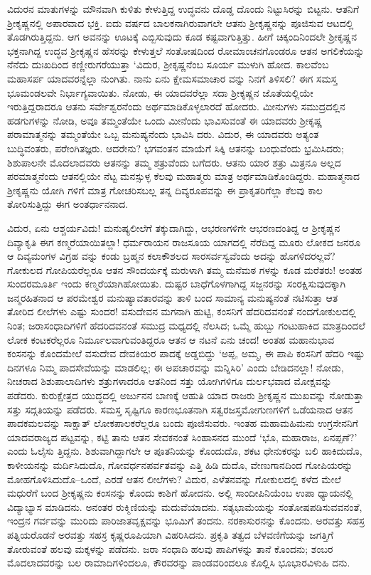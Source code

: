 ವಿದುರನ ಮಾತುಗಳನ್ನು ಮೌನವಾಗಿ ಕುಳಿತು ಕೇಳುತ್ತಿದ್ದ ಉದ್ಧವನು ದೊಡ್ಡ ದೊಂದು ನಿಟ್ಟುಸಿರನ್ನು ಬಿಟ್ಟನು. ಆತನಿಗೆ ಶ್ರೀಕೃಷ್ಣನಲ್ಲಿ ಅಪಾರವಾದ ಭಕ್ತಿ. ಐದು ವರ್ಷದ ಬಾಲಕನಾಗಿರುವಾಗಲೇ ಆತನು ಶ್ರೀಕೃಷ್ಣನನ್ನು ಪೂಜಿಸುವ ಆಟದಲ್ಲಿ ತೊಡಗಿರುತ್ತಿದ್ದನು. ಆಗ ಅವನನ್ನು ಊಟಕ್ಕೆ ಎಬ್ಬಿಸುವುದು ಕೂಡ ಕಷ್ಟವಾಗುತ್ತಿತ್ತು. ಹೀಗೆ ಚಿಕ್ಕಂದಿನಿಂದಲೇ ಶ್ರೀಕೃಷ್ಣನ ಭಕ್ತನಾಗಿದ್ದ ಉದ್ಧವ ಶ್ರೀಕೃಷ್ಣನ ಹೆಸರನ್ನು ಕೇಳುತ್ತಲೆ ಸಂತೋಷದಿಂದ ರೋಮಾಂಚನಗೊಂಡರೂ ಆತನ ಅಗಲಿಕೆಯನ್ನು ನೆನೆದು ದುಃಖದಿಂದ ಕಣ್ಣೀರುಗರೆಯುತ್ತಾ ‘ವಿದುರ, ಶ್ರೀಕೃಷ್ಣನೆಂಬ ಸೂರ್ಯ ಮುಳುಗಿ ಹೋದ. ಕಾಲವೆಂಬ ಮಹಾಸರ್ಪ ಯಾದವರನ್ನೆಲ್ಲಾ ನುಂಗಿತು. ನಾನು ಏನು ಕ್ಷೇಮಸಮಾಚಾರ ವನ್ನು ನಿನಗೆ ತಿಳಿಸಲಿ? ಈಗ ಸಮಸ್ತ ಭೂಮಂಡಲವೇ ನಿರ್ಭಾಗ್ಯವಾಯಿತು. ನೋಡು, ಈ ಯಾದವರೆಲ್ಲಾ ಸದಾ ಶ್ರೀಕೃಷ್ಣನ ಜೊತೆಯಲ್ಲಿಯೇ ಇರುತ್ತಿದ್ದರಾದರೂ ಆತನು ಸರ್ವೇಶ್ವರನೆಂದು ಅರ್ಥಮಾಡಿಕೊಳ್ಳಲಾರದೆ ಹೋದರು. ಮೀನುಗಳು ಸಮುದ್ರದಲ್ಲಿನ ಹಡಗುಗಳನ್ನು ನೋಡಿ, ಅವೂ ತಮ್ಮಂತೆಯೇ ಒಂದು ಮೀನೆಂದು ಭಾವಿಸುವಂತೆ ಈ ಯಾದವರು ಶ್ರೀಕೃಷ್ಣ ಪರಾಮಾತ್ಮನನ್ನು ತಮ್ಮಂತೆಯೇ ಒಬ್ಬ ಮನುಷ್ಯನೆಂದು ಭಾವಿಸಿ ದರು. ವಿದುರ, ಈ ಯಾದವರು ಅತ್ಯಂತ ಬುದ್ಧಿವಂತರು, ಪರೇಂಗಿತಜ್ಞರು. ಆದರೇನು? ಭಗವಂತನ ಮಾಯೆಗೆ ಸಿಕ್ಕಿ ಆತನನ್ನು ಬಂಧುವೆಂದು ಭ್ರಮಿಸಿದರು; ಶಿಶುಪಾಲನೇ ಮೊದಲಾದವರು ಆತನನ್ನು ತಮ್ಮ ಶತ್ರುವೆಂದು ಬಗೆದರು. ಆತನು ಯಾರ ಶತ್ರು ಮಿತ್ರನೂ ಅಲ್ಲದ ಪರಮಾತ್ಮನೆಂದು ಆತನಲ್ಲಿಯೇ ನೆಟ್ಟ ಮನಸ್ಸುಳ್ಳ ಕೆಲವು ಮಹಾತ್ಮರು ಮಾತ್ರ ಅರ್ಥಮಾಡಿಕೊಂಡಿದ್ದರು. ಮಹಾತ್ಮನಾದ ಶ್ರೀಕೃಷ್ಣನು ಯೋಗಿ ಗಳಿಗೆ ಮಾತ್ರ ಗೋಚರಿಸಬಲ್ಲ ತನ್ನ ದಿವ್ಯರೂಪವನ್ನು ಈ ಪ್ರಾಕೃತರಿಗೆಲ್ಲಾ ಕೆಲವು ಕಾಲ ತೋರಿಸುತ್ತಿದ್ದು ಈಗ ಅಂತರ್ಧಾನನಾದ.

ವಿದುರ, ಏನು ಆಶ್ಚರ್ಯವಿದು! ಮನುಷ್ಯಲೀಲೆಗೆ ತಕ್ಕುದಾಗಿದ್ದು, ಆಭರಣಗಳಿಗೇ ಆಭರಣದಂತಿದ್ದ ಆ ಶ್ರೀಕೃಷ್ಣನ ದಿವ್ಯಾಕೃತಿ ಈಗ ಕಣ್ಮರೆಯಾಯಿತಲ್ಲಾ! ಧರ್ಮರಾಯನ ರಾಜಸೂಯ ಯಾಗದಲ್ಲಿ ನೆರೆದಿದ್ದ ಮೂರು ಲೋಕದ ಜನರೂ ಆ ದಿವ್ಯಮಂಗಳ ವಿಗ್ರಹ ವನ್ನು ಕಂಡು ಬ್ರಹ್ಮನ ಕಲಾಕೌಶಲದ ಸಾರಸರ್ವಸ್ವವೆಂದು ಅದನ್ನು ಹೊಗಳಿದರಲ್ಲವೆ? ಗೋಕುಲದ ಗೋಪಿಯರೆಲ್ಲರೂ ಆತನ ಸೌಂದರ್ಯಕ್ಕೆ ಮರುಳಾಗಿ ತಮ್ಮ ಮನೆಮಠ ಗಳನ್ನು ಕೂಡ ಮರೆತರು! ಅಂತಹ ಸುಂದರಮೂರ್ತಿ ಇಂದು ಕಣ್ಮರೆಯಾಗಿಹೋಯಿತು. ದುಷ್ಟರ ಬಾಧೆಗೊಳಗಾಗಿದ್ದ ಸಜ್ಜನರನ್ನು ಸಂರಕ್ಷಿಸುವುದಕ್ಕಾಗಿ ಜನ್ಮರಹಿತನಾದ ಆ ಪರಮೇಶ್ವರ ಮನುಷ್ಯಾವತಾರವನ್ನು ತಾಳಿ ಬಂದ ಸಾಮಾನ್ಯ ಮನುಷ್ಯನಂತೆ ನಟಿಸುತ್ತಾ ಆತ ತೋರಿದ ಲೀಲೆಗಳು ಎಷ್ಟು ಸುಂದರ! ವಸುದೇವನ ಮಗನಾಗಿ ಹುಟ್ಟಿ, ಕಂಸನಿಗೆ ಹೆದರಿದವನಂತೆ ನಂದಗೋಕುಲದಲ್ಲಿ ನಿಂತ; ಜರಾಸಂಧಾದಿಗಳಿಗೆ ಹೆದರಿದವನಂತೆ ಸಮುದ್ರ ಮಧ್ಯದಲ್ಲಿ ನೆಲಸಿದ; ಒಮ್ಮೆ ಹುಬ್ಬು ಗಂಟುಹಾಕಿದ ಮಾತ್ರದಿಂದಲೆ ಲೋಕ ಕಂಟಕರೆಲ್ಲರೂ ನಿರ್ಮೂಲವಾಗುವಂತಿದ್ದರೂ ಆತನ ಆ ನಟನೆ ಏನು ಚಂದ! ಅಂತಹ ಮಹಾನುಭಾವ ಕಂಸನನ್ನು ಕೊಂದಮೇಲೆ ವಸುದೇವ ದೇವಕಿಯರ ಪಾದಕ್ಕೆ ಅಡ್ಡಬಿದ್ದು ‘ಅಪ್ಪ, ಅಮ್ಮ, ಈ ಪಾಪಿ ಕಂಸನಿಗೆ ಹೆದರಿ ಇಷ್ಟು ದಿನಗಳೂ ನಿಮ್ಮ ಪಾದಸೇವೆಯನ್ನು ಮಾಡಲಿಲ್ಲ; ಈ ಅಪಚಾರವನ್ನು ಮನ್ನಿಸಿರಿ’ ಎಂದು ಬೇಡಿದನಲ್ಲಾ! ನೋಡು, ನೀಚರಾದ ಶಿಶುಪಾಲಾದಿಗಳು ಶತ್ರುಗಳಾದರೂ ಆತನಿಂದ ಸತ್ತು ಯೋಗಿಗಳಿಗೂ ದುರ್ಲಭವಾದ ಮೋಕ್ಷವನ್ನು ಪಡೆದರು. ಕುರುಕ್ಷೇತ್ರದ ಯುದ್ಧದಲ್ಲಿ ಅರ್ಜುನನ ಬಾಣಕ್ಕೆ ಆಹುತಿ ಯಾದ ರಾಜರು ಶ್ರೀಕೃಷ್ಣನ ಮುಖವನ್ನು ನೋಡುತ್ತಾ ಸತ್ತು ಸದ್ಗತಿಯನ್ನು ಪಡೆದರು. ಸಮಸ್ತ ಸೃಷ್ಟಿಗೂ ಕಾರಣಭೂತನಾಗಿ ಸತ್ವರಜಸ್ತಮೋಗುಣಗಳಿಗೆ ಒಡೆಯನಾದ ಆತನ ಪಾದಕಮಲವನ್ನು ಸಾಕ್ಷಾತ್ ಲೋಕಪಾಲಕರೆಲ್ಲರೂ ಬಂದು ಪೂಜಿಸುವರು. ಇಂತಹ ಮಹಾಮಹಿಮನು ಉಗ್ರಸೇನನಿಗೆ ಯಾದವರಾಜ್ಯದ ಪಟ್ಟವನ್ನು, ಕಟ್ಟಿ ತಾನು ಆತನ ಸೇವಕನಂತೆ ಸಿಂಹಾಸನದ ಮುಂದೆ ‘ಭೊ, ಮಹಾರಾಜ, ಏನಪ್ಪಣೆ?’ ಎಂದು ಓಲೈಸು ತ್ತಿದ್ದನು. ಶಿಶುವಾಗಿದ್ದಾಗಲೇ ಆ ಪೂತನಿಯನ್ನು ಕೊಂದುದೊ, ಶಕಟ ಧೇನುಕರನ್ನು ಬಲಿ ಹಾಕಿದುದೊ, ಕಾಳೀಯನನ್ನು ಮರ್ದಿಸಿದುದೊ, ಗೋವರ್ಧನಪರ್ವತವನ್ನು ಎತ್ತಿ ಹಿಡಿ ದುದೊ, ವೇಣುಗಾನದಿಂದ ಗೋಪಿಯರನ್ನು ಮೋಹಗೊಳಿಸಿದುದೊ–ಒಂದೆ, ಎರಡೆ ಆತನ ಲೀಲೆಗಳು? ವಿದುರ, ಎಳೆತನವನ್ನು ಗೋಕುಲದಲ್ಲಿ ಕಳೆದ ಮೇಲೆ ಮಧುರೆಗೆ ಬಂದ ಶ್ರೀಕೃಷ್ಣನು ಕಂಸನನ್ನು ಕೊಂದು ಕಾಶಿಗೆ ಹೋದನು. ಅಲ್ಲಿ ಸಾಂದೀಪಿನಿಯೆಂಬ ಉಪಾ ಧ್ಯಾಯನಲ್ಲಿ ವಿದ್ಯಾಭ್ಯಾಸ ಮಾಡಿದನು. ಅನಂತರ ರುಕ್ಮಿಣಿಯನ್ನು ಮದುವೆಯಾದನು. ಸತ್ಯಭಾಮೆಯನ್ನು ಸಂತೋಷಪಡಿಸುವವನಂತೆ, ಇಂದ್ರನ ಗರ್ವವನ್ನು ಮುರಿದು ಪಾರಿಜಾತವೃಕ್ಷವನ್ನು ಭೂಮಿಗೆ ತಂದನು. ನರಕಾಸುರನನ್ನು ಕೊಂದನು. ಅರವತ್ತು ಸಹಸ್ರ ಪತ್ನಿಯರೊಡನೆ ಅರವತ್ತು ಸಹಸ್ರ ಕೃಷ್ಣರೂಪಿಯಾಗಿ ವಿಹರಿಸಿದನು. ಪ್ರಕೃತಿ ತತ್ವದ ಬೆಳವಣಿಗೆಯನ್ನು ಜಗತ್ತಿಗೆ ತೋರುವಂತೆ ಹಲವು ಮಕ್ಕಳನ್ನು ಪಡೆದನು. ಜರಾ ಸಂಧಾದಿ ಹಲವು ಪಾಪಿಗಳನ್ನು ತಾನೆ ಕೊಂದನು; ಶಂಬರ ಮೊದಲಾದವರನ್ನು ಬಲ ರಾಮಾದಿಗಳಿಂದಲೂ, ಕೌರವರನ್ನು ಪಾಂಡವರಿಂದಲೂ ಕೊಲ್ಲಿಸಿ ಭೂಭಾರವಿಳುಹಿ ದನು.

